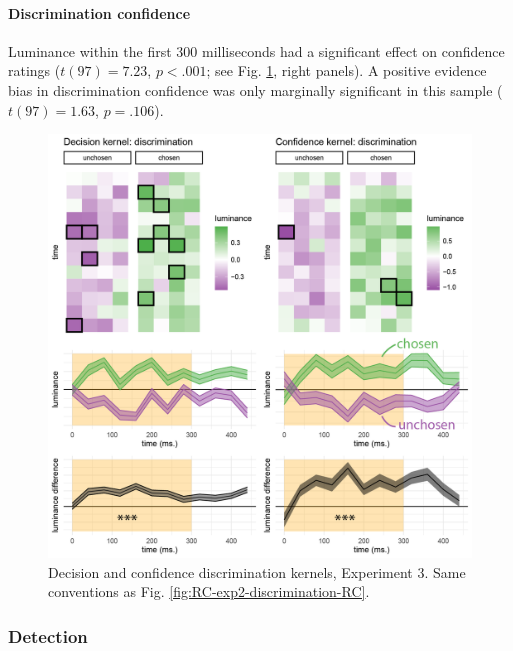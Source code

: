 \documentclass[12pt,twoside]{reedthesis}
\begin{document}
\hypertarget{discrimination-confidence-1}{%
\paragraph{Discrimination confidence}\label{discrimination-confidence-1}}

Luminance within the first 300 milliseconds had a significant effect on confidence ratings (\(t(97) = 7.23\), \(p < .001\); see Fig. \ref{fig:RC-exp3-discrimination-RC}, right panels). A positive evidence bias in discrimination confidence was only marginally significant in this sample (\(t(97) = 1.63\), \(p = .106\)).


\begin{figure}
\includegraphics[width=\textwidth]{figure/RC/RC-exp3-discrimination-RC-enhanced} \caption[Decision kernels in discrimination, Exp. 3]{Decision and confidence discrimination kernels, Experiment 3. Same conventions as Fig. \ref{fig:RC-exp2-discrimination-RC}.}\label{fig:RC-exp3-discrimination-RC}
\end{figure}
\hypertarget{detection-1}{%
\subsubsection{Detection}\label{detection-1}}
\end{document}
